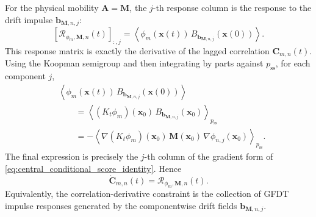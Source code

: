 \documentclass[11pt,twoside,fleqn]{article}
\begin{document}
For the physical mobility \(\bm{A}=\bm{M}\), the \(j\)-th response column is
the response to the drift impulse \(\bm{b}_{\bm{M},n,j}\):
\begin{equation}
    \left[\bm{\mathcal{R}}_{\phi_m,\bm{M},n}(t)\right]_{:,j}
    =
    \left\langle
        \phi_m(\bm{x}(t))\,
        B_{\bm{b}_{\bm{M},n,j}}(\bm{x}(0))
    \right\rangle .
    \label{eq:gfdt_response_M_grad_phi_n}
\end{equation}
This response matrix is exactly the derivative of the lagged
correlation \(\bm{C}_{m,n}(t)\). Using the Koopman semigroup and then
integrating by parts against \(p_{\mathrm{ss}}\), for each component \(j\),
\begin{align}
    &\left\langle
        \phi_m(\bm{x}(t))\,
        B_{\bm{b}_{\bm{M},n,j}}(\bm{x}(0))
    \right\rangle
    \nonumber\\
    &\qquad=
    \left\langle
        (K_t\phi_m)(\bm{x}_0)\,
        B_{\bm{b}_{\bm{M},n,j}}(\bm{x}_0)
    \right\rangle_{p_{\mathrm{ss}}}
    \nonumber\\
    &\qquad=
    -
    \left\langle
        \nabla(K_t\phi_m)(\bm{x}_0)\,
        \bm{M}(\bm{x}_0)\,
        \nabla\phi_{n,j}(\bm{x}_0)
    \right\rangle_{p_{\mathrm{ss}}}.
    \label{eq:gfdt_response_integration_by_parts}
\end{align}
The final expression is precisely the \(j\)-th column of the gradient form of
\eqref{eq:central_conditional_score_identity}. Hence
\begin{equation}
    \dot{\bm{C}}_{m,n}(t)
    =
    \bm{\mathcal{R}}_{\phi_m,\bm{M},n}(t).
    \label{eq:Cdot_as_gfdt_response}
\end{equation}
Equivalently, the correlation-derivative constraint is the collection of GFDT
impulse responses generated by the componentwise drift fields
\(\bm{b}_{\bm{M},n,j}\).
\end{document}
